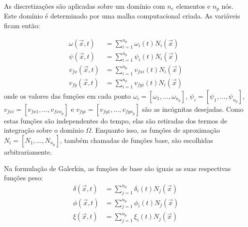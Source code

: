 As discretizações são aplicadas sobre um domínio com $n_e$ elementos e $n_p$ nós.
Este domínio é determinado por uma malha computacional criada.
As variáveis ficam então:

\begin{align}
    \omega(\vec{x}, t) &= \sum_{i=1}^{n_p} \omega_i(t) N_i(\vec{x}) \\
    \psi(\vec{x}, t) &= \sum_{i=1}^{n_p} \psi_i(t) N_i(\vec{x}) \\
    v_{fx}(\vec{x}, t) &= \sum_{i=1}^{n_p} v_{fxi}(t) N_i(\vec{x}) \\
    v_{fy}(\vec{x}, t) &= \sum_{i=1}^{n_p} v_{fyi}(t) N_i(\vec{x}) 
\end{align}
onde os valores das funções em cada ponto $\omega_i = [\omega_1, \ldots, \omega_{n_p}]$, $\psi_i = [\psi_1, \ldots, \psi_{n_p}]$, $v_{fxi} = [v_{fx1}, \ldots, v_{fxn_p}]$ e $v_{fyi} = [v_{fy1}, \ldots, v_{fyn_p}]$ são as incógnitas desejadas.
Como estas funções são independentes do tempo, elas são retiradas dos termos de integração sobre o domínio $\Omega$.
Enquanto isso, as funções de aproximação $N_{i} = [N_{1}, \ldots, N_{n_p}]$, também chamadas de funções base, são escolhidas arbitrariamente.

Na formulação de Galerkin, as funções de base são iguais as suas respectivas funções peso:
\begin{align}
    \delta(\vec{x}, t) &= \sum_{j=1}^{n_p} \delta_i(t) N_j(\vec{x}) \\
    \phi(\vec{x}, t) &= \sum_{j=1}^{n_p} \phi_i(t) N_j(\vec{x}) \\
    \xi(\vec{x}, t) &= \sum_{j=1}^{n_p} \xi_i(t) N_j(\vec{x})
\end{align}


